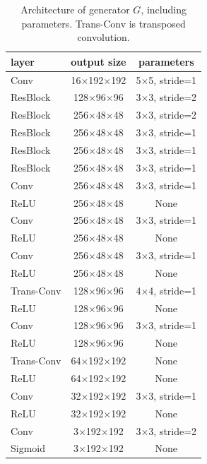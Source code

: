 \documentclass{article}
\begin{document}
\begin{table}[h] 
  \centering  
    \begin{tabular}{lcc}  
    \hline
    \textbf{layer} & \textbf{output size} & \textbf{parameters}\\ 
    \hline \hline
      Conv & 16$\times$192$\times$192 & 5$\times$5, stride=1 \\
    \hline
      ResBlock & 128$\times$96$\times$96 & 3$\times$3, stride=2 \\
    \hline
      ResBlock & 256$\times$48$\times$48 & 3$\times$3, stride=2 \\
    \hline
      ResBlock & 256$\times$48$\times$48 & 3$\times$3, stride=1 \\
    \hline
      ResBlock & 256$\times$48$\times$48 & 3$\times$3, stride=1 \\
    \hline
      ResBlock & 256$\times$48$\times$48 & 3$\times$3, stride=1 \\
    \hline
      Conv & 256$\times$48$\times$48 & 3$\times$3, stride=1 \\
    \hline
      ReLU & 256$\times$48$\times$48 & None \\
    \hline
      Conv & 256$\times$48$\times$48 & 3$\times$3, stride=1 \\
    \hline
      ReLU & 256$\times$48$\times$48 & None \\
    \hline
      Conv & 256$\times$48$\times$48 & 3$\times$3, stride=1 \\
    \hline
      ReLU & 256$\times$48$\times$48 & None \\
    \hline
      Trans-Conv & 128$\times$96$\times$96 & 4$\times$4, stride=1 \\
    \hline
      ReLU & 128$\times$96$\times$96 & None \\
    \hline
      Conv & 128$\times$96$\times$96 & 3$\times$3, stride=1 \\
    \hline
      ReLU & 128$\times$96$\times$96 & None \\
    \hline
      Trans-Conv & 64$\times$192$\times$192 & None \\
    \hline
      ReLU & 64$\times$192$\times$192 & None \\
    \hline
      Conv & 32$\times$192$\times$192 & 3$\times$3, stride=1 \\
    \hline
      ReLU & 32$\times$192$\times$192 & None \\
    \hline
      Conv & 3$\times$192$\times$192 & 3$\times$3, stride=2 \\
    \hline
      Sigmoid & 3$\times$192$\times$192 & None \\
    \hline
    \end{tabular}
  
  \caption{Architecture of generator $G$, including parameters. Trans-Conv is transposed convolution.} 
  \label{tab:1} 
\end{table}
\end{document}
